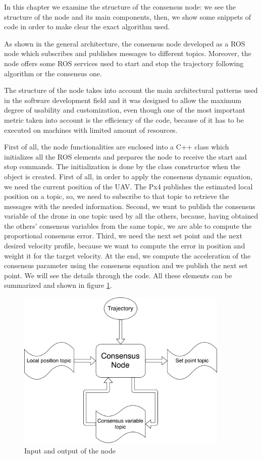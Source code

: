 In this chapter we examine the structure of the consensus node: we see the
structure of the node and its main components, then, we show some snippets of code
in order to make clear the exact algorithm used.

As shown in the general architecture, %
the consensus node developed as a ROS node which subscribes and publishes messages
to different topics.
Moreover, the node offers some ROS services used to start and stop the trajectory
following algorithm or the consensus one.

The structure of the node takes into account the main architectural patterns used
in the software development field and it was designed to allow the maximum degree
of usability and customization, even though one of the most important metric taken
into account is the efficiency of the code, because of it has to be executed on
machines with limited amount of resources.

First of all, the node functionalities are enclosed into a C++ class which initializes
all the ROS elements and prepares the node to receive the start and stop commands.
The initialization is done by the class constructor when the object is created.
First of all, in order to apply the consensus dynamic equation, we need
the current position of the UAV. The Px4 publishes the estimated local position on
a topic, %
so, we need to subscribe to that topic to retrieve the messages with the needed
information.
Second, we want to publish the consensus variable of the drone in one topic used
by all the others, because, having obtained the others' consensus variables
from the same topic, we are able to compute the proportional consensus error.
Third, we need the next set point and the next desired velocity profile,
because we want to compute the error in position and weight it for the target velocity. %
At the end, we compute the acceleration of the consensus parameter using the consensus equation %
and we publish the next set point. We will see the details through the code.
All these elements can be summarized and shown in figure \ref{fig:node_in_out}.

\begin{figure}[h]
\centering
\includegraphics[width=0.9\textwidth]{chapters/chapter-04/figures/consensus_node_structure.pdf}
\caption{Input and output of the node}
\label{fig:node_in_out}
\end{figure}

